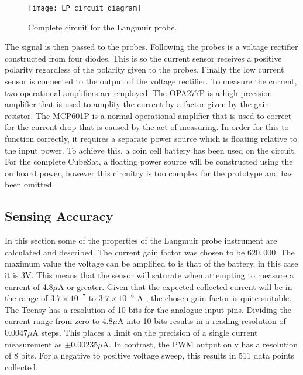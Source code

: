 \begin{figure}[h]
	\centering
	\texttt{[image: LP\_circuit\_diagram]}
	\caption{Complete circuit for the Langmuir probe.}
	\label{fig:LP_circuit_diagram}
\end{figure}

The signal is then passed to the probes. Following the probes is a voltage rectifier constructed from four diodes. This is so the current sensor receives a positive polarity regardless of the polarity given to the probes. Finally the low current sensor is connected to the output of the voltage rectifier. To measure the current, two operational amplifiers are employed. The OPA277P is a high precision amplifier that is used to amplify the current by a factor given by the gain resistor. The MCP601P is a normal operational amplifier that is used to correct for the current drop that is caused by the act of measuring. In order for this to function correctly, it requires a separate power source which is floating relative to the input power. To achieve this, a coin cell battery has been used on the circuit. For the complete CubeSat, a floating power source will be constructed using the on board power, however this circuitry is too complex for the prototype and has been omitted.

\subsection{Sensing Accuracy}
In this section some of the properties of the Langmuir probe instrument are calculated and described. The current gain factor was chosen to be $620,000$. The maximum value the voltage can be amplified to is that of the battery, in this case it is 3V. This means that the sensor will saturate when attempting to measure a current of 4.8$\mu$A or greater. Given that the expected collected current will be in the range of $3.7\times 10^{-7}$ to $3.7\times 10^{-6}$ A \cite{na_test_2015}, the chosen gain factor is quite suitable.\\

The Teensy has a resolution of 10 bits for the analogue input pins. Dividing the current range from zero to 4.8$\mu$A into 10 bits results in a reading resolution of $0.0047\mu$A steps. This places a limit on the precision of a single current measurement as $\pm 0.00235\mu$A. In contrast, the PWM output only has a resolution of 8 bits. For a negative to positive voltage sweep, this results in 511 data points collected.\\

